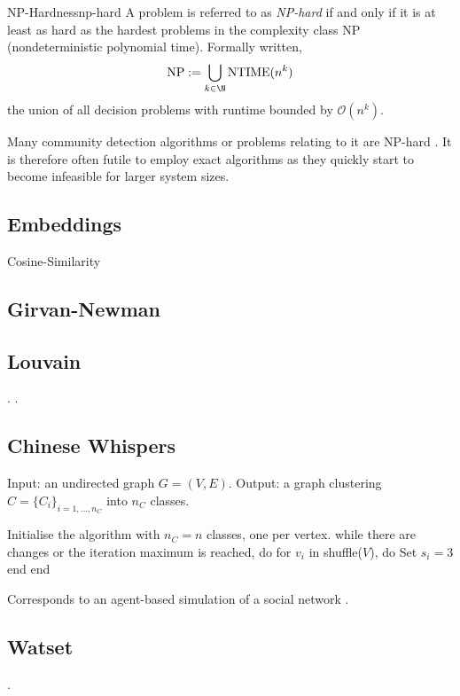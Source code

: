 \documentclass[12pt, a4paper]{article}
\begin{document}
  \begin{definition}{NP-Hardness}{np-hard}
    A problem is referred to as \textit{NP-hard} if and only if it is at least as hard as the hardest problems in the complexity class NP (nondeterministic polynomial time). Formally written,
    $$\mathrm{NP} := \bigcup_{k \in \N} \mathrm{NTIME}(n^k)$$
    the union of all decision problems with runtime bounded by $\mathcal{O}(n^k)$.
  \end{definition}

  Many community detection algorithms or problems relating to it are NP-hard \parencite{fortunato}.
  It is therefore often futile to employ exact algorithms as they quickly start to become infeasible for larger system sizes.

  \subsection{Embeddings}
  Cosine-Similarity

  \subsection{Girvan-Newman}
  \subsection{Louvain}
  \cite{grindrod-lecture-notes}.
  \cite{lambiotte-louvain-clustering}.


  \subsection{Chinese Whispers}
  \begin{algorithm}[language=pseudo, caption={\centering The \textit{Chinese Whispers} algorithm due to \cite{cw-biemann}}]
Input: an undirected graph $G = (V, E)$.
Output: a graph clustering $C = \{C_i\}_{i=1, ..., n_C}$ into $n_C$ classes.

Initialise the algorithm with $n_C = n$ classes, one per vertex.
while there are changes or the iteration maximum is reached, do
  for $v_i$ in shuffle($V$), do
    Set $s_i = 3$
  end
end
  \end{algorithm}

  Corresponds to an agent-based simulation of a social network
  \cite{cw-biemann}.

  \subsection{Watset}
  \cite{watset}.
\end{document}
